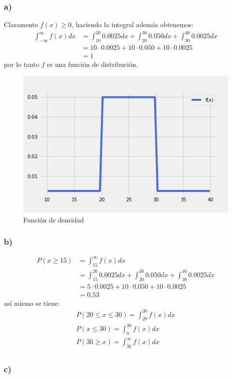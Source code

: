 \documentclass{article}
\begin{document}
\begin{tcolorbox}[breakable]
    \subsubsection*{a)}
    Claramente $f(x)\geq 0$, haciendo la integral además obtenemos:
    \begin{align*}
        \int_{-\infty}^\infty f(x)dx 
        &= \int_{10}^20 0.0025dx + \int_{20}^{30} 0.050dx + \int_{30}^40 0.0025dx \\
        &= 10 \cdot 0.0025 + 10 \cdot 0.050 + 10 \cdot 0.0025 \\
        &= 1
    \end{align*}
    por lo tanto $f$ es una función de distribución.
    \begin{figure}[H]
        \centering
        \includegraphics[scale=0.7]{images/p4_density.png}
        \caption{Función de densidad}
    \end{figure}
    \subsubsection*{b)}
    \begin{align*}
        P (x\geq 15) 
        &= \int_{15}^\infty f(x) dx \\
        &= \int_{15}^{20} 0.0025dx + \int_{20}^{30} 0.050dx + \int_{30}^{40} 0.0025dx \\
        &= 5 \cdot 0.0025 + 10 \cdot 0.050 + 10 \cdot 0.0025 \\
        &= 0.53
    \end{align*}
    así mismo se tiene:
    \begin{align*}
        P(20 \leq x \leq 30) = \int_{20}^{30} f(x)dx \\
        P(x \leq 30) = \int_{0}^{30} f(x)dx \\
        P(36 \geq x ) = \int_{36}^\infty f(x)dx \\ 
    \end{align*}

    \subsubsection*{c)}

\end{tcolorbox}
\end{document}
